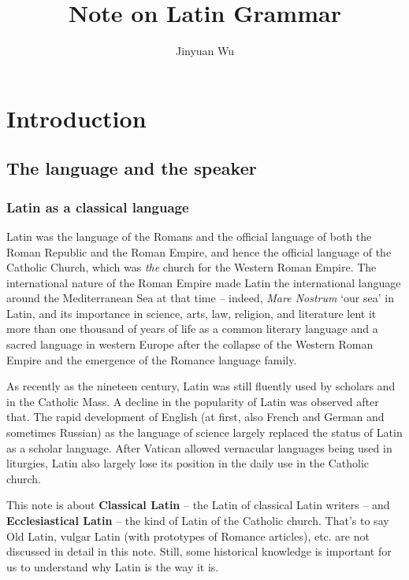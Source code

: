 \documentclass[a4paper, oneside, 12pt]{report}
\title{Note on Latin Grammar}
\author{Jinyuan Wu}
\newcommand*{\concept}[1]{\textbf{#1}}
\newcommand{\form}[1]{\emph{#1}}
\newcommand{\translate}[1]{`#1'}
\begin{document}
\automath

\maketitle

\chapter{Introduction}

\section{The language and the speaker}

\subsection{Latin as a classical language}

Latin was the language of the Romans
and the official language of both the Roman Republic and the Roman Empire,
and hence the official language of the Catholic Church, 
which was \emph{the} church for the Western Roman Empire. 
The international nature of the Roman Empire made Latin 
the international language around the Mediterranean Sea at that time -- 
indeed, \form{Mare Nostrum} \translate{our sea} in Latin,
and its importance in science, arts, law, religion, and literature 
lent it more than one thousand of years of life 
as a common literary language and a sacred language in western Europe
after the collapse of the Western Roman Empire 
and the emergence of the Romance language family.

As recently as the nineteen century,
Latin was still fluently used by scholars and in the Catholic Mass. 
A decline in the popularity of Latin was observed after that.
The rapid development of English (at first, also French and German and sometimes Russian)
as the language of science 
largely replaced the status of Latin as a scholar language.
After Vatican allowed vernacular languages being used in liturgies, 
Latin also largely lose its position in the daily use in the Catholic church. 

This note is about \concept{Classical Latin} -- the Latin of classical Latin writers -- 
and \concept{Ecclesiastical Latin} -- the kind of Latin of the Catholic church.
That's to say Old Latin, vulgar Latin (with prototypes of Romance articles), etc.
are not discussed in detail in this note.
Still, some historical knowledge is important for us to understand 
why Latin is the way it is. 
\end{document}
